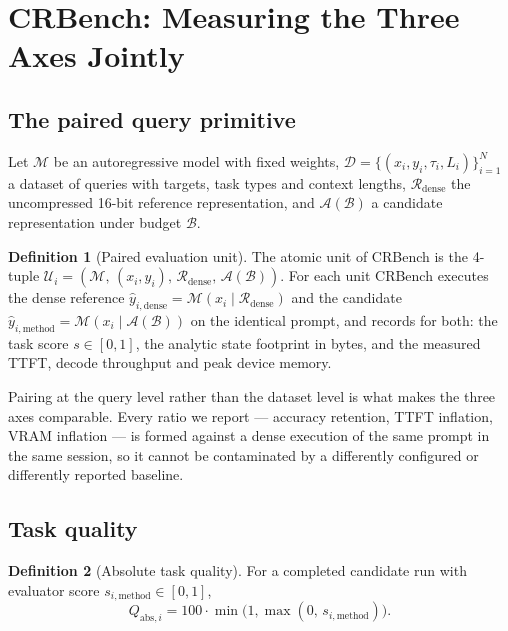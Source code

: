 \documentclass{article}
\theoremstyle{definition}
\newtheorem{definition}{Definition}
\begin{document}
\section{CRBench: Measuring the Three Axes Jointly}
\label{sec:crbench}

\subsection{The paired query primitive}

Let $\mathcal{M}$ be an autoregressive model with fixed weights, $\mathcal{D} = \{(x_i, y_i, \tau_i, L_i)\}_{i=1}^N$ a dataset of queries with targets, task types and context lengths, $\mathcal{R}_{\text{dense}}$ the uncompressed 16-bit reference representation, and $\mathcal{A}(\mathcal{B})$ a candidate representation under budget $\mathcal{B}$.

\begin{definition}[Paired evaluation unit]
\label{def:unit}
The atomic unit of CRBench is the 4-tuple $\mathcal{U}_i = (\mathcal{M},\, (x_i,y_i),\, \mathcal{R}_{\text{dense}},\, \mathcal{A}(\mathcal{B}))$. For each unit CRBench executes the dense reference $\hat{y}_{i,\text{dense}} = \mathcal{M}(x_i \mid \mathcal{R}_{\text{dense}})$ and the candidate $\hat{y}_{i,\text{method}} = \mathcal{M}(x_i \mid \mathcal{A}(\mathcal{B}))$ on the identical prompt, and records for both: the task score $s \in [0,1]$, the analytic state footprint in bytes, and the measured TTFT, decode throughput and peak device memory.
\end{definition}

Pairing at the query level rather than the dataset level is what makes the three axes comparable. Every ratio we report --- accuracy retention, TTFT inflation, VRAM inflation --- is formed against a dense execution of the same prompt in the same session, so it cannot be contaminated by a differently configured or differently reported baseline.

\subsection{Task quality}

\begin{definition}[Absolute task quality]
For a completed candidate run with evaluator score $s_{i,\text{method}} \in [0,1]$,
\begin{equation}
\label{eq:quality}
Q_{\text{abs},i} = 100 \cdot \min\!\big(1, \max(0,\, s_{i,\text{method}})\big).
\end{equation}
\end{definition}
\end{document}
